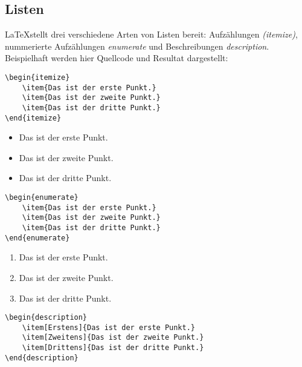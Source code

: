 \subsection{Listen}

\LaTeX stellt drei verschiedene Arten von Listen bereit: Aufzählungen \emph{(itemize)}, nummerierte Aufzählungen \emph{enumerate} und Beschreibungen \emph{description}.
Beispielhaft werden hier Quellcode und Resultat dargestellt:


\begin{verbatim}
\begin{itemize}
    \item{Das ist der erste Punkt.}
    \item{Das ist der zweite Punkt.}
    \item{Das ist der dritte Punkt.}
\end{itemize}
\end{verbatim}

\begin{itemize}
    \item{Das ist der erste Punkt.}
    \item{Das ist der zweite Punkt.}
    \item{Das ist der dritte Punkt.}
\end{itemize}


\begin{verbatim}
\begin{enumerate}
    \item{Das ist der erste Punkt.}
    \item{Das ist der zweite Punkt.}
    \item{Das ist der dritte Punkt.}
\end{enumerate}
\end{verbatim}

\begin{enumerate}
    \item{Das ist der erste Punkt.}
    \item{Das ist der zweite Punkt.}
    \item{Das ist der dritte Punkt.}
\end{enumerate}


\begin{verbatim}
\begin{description}
    \item[Erstens]{Das ist der erste Punkt.}
    \item[Zweitens]{Das ist der zweite Punkt.}
    \item[Drittens]{Das ist der dritte Punkt.}
\end{description}
\end{verbatim}

